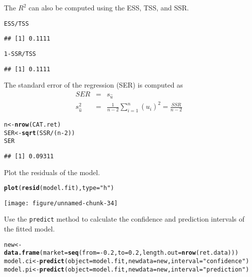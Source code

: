 \documentclass[a4paper]{article}\usepackage[]{graphicx}\usepackage[]{color}
\makeatletter
\def\maxwidth{ %
  \ifdim\Gin@nat@width>\linewidth
    \linewidth
  \else
    \Gin@nat@width
  \fi
}
\newcommand{\hlstr}[1]{\textcolor[rgb]{0.192,0.494,0.8}{#1}}%
\newcommand{\hlkwd}[1]{\textcolor[rgb]{0.737,0.353,0.396}{\textbf{#1}}}%
\newenvironment{kframe}{%
 \def\at@end@of@kframe{}%
 \ifinner\ifhmode%
  \def\at@end@of@kframe{\end{minipage}}%
  \begin{minipage}{\columnwidth}%
 \fi\fi%
 \def\FrameCommand##1{\hskip\@totalleftmargin \hskip-\fboxsep
 \colorbox{shadecolor}{##1}\hskip-\fboxsep
     \hskip-\linewidth \hskip-\@totalleftmargin \hskip\columnwidth}%
 \MakeFramed {\advance\hsize-\width
   \@totalleftmargin\z@ \linewidth\hsize
   \@setminipage}}%
 {\par\unskip\endMakeFramed%
 \at@end@of@kframe}
\newenvironment{knitrout}{}{} %
\makeatother
\begin{document}
The $R^2$ can also be computed using the ESS, TSS, and SSR.
\begin{knitrout}
\color{fgcolor}\begin{kframe}
\begin{alltt}
ESS/TSS
\end{alltt}
\begin{verbatim}
## [1] 0.1111
\end{verbatim}
\begin{alltt}
1 - SSR/TSS
\end{alltt}
\begin{verbatim}
## [1] 0.1111
\end{verbatim}
\end{kframe}
\end{knitrout}


The standard error of the regression (SER) is computed as
\begin{eqnarray}
SER &=& s_{\hat{u}}\\
s^2_{\hat{u}} &=& \frac{1}{n-2} \sum_{i=1}^n (\hat{u}_i)^2 = \frac{SSR}{n-2}
\end{eqnarray}
\begin{knitrout}
\color{fgcolor}\begin{kframe}
\begin{alltt}
n <- \hlkwd{nrow}(CAT.ret)
SER <- \hlkwd{sqrt}(SSR/(n - 2))
SER
\end{alltt}
\begin{verbatim}
## [1] 0.09311
\end{verbatim}
\end{kframe}
\end{knitrout}



Plot the residuals of the model.
\begin{knitrout}
\color{fgcolor}\begin{kframe}
\begin{alltt}
\hlkwd{plot}(\hlkwd{resid}(model.fit), type = \hlstr{"h"})
\end{alltt}
\end{kframe}
\texttt{[image: figure/unnamed-chunk-34]} 

\end{knitrout}



Use the \verb"predict" method to calculate the confidence and prediction intervals of the fitted model.
\begin{knitrout}
\color{fgcolor}\begin{kframe}
\begin{alltt}
new <- \hlkwd{data.frame}(market = \hlkwd{seq}(from = -0.2, to = 0.2, length.out = \hlkwd{nrow}(ret.data)))
model.ci <- \hlkwd{predict}(object = model.fit, newdata = new, interval = \hlstr{"confidence"})
model.pi <- \hlkwd{predict}(object = model.fit, newdata = new, interval = \hlstr{"prediction"})
\end{alltt}
\end{kframe}
\end{knitrout}
\end{document}
